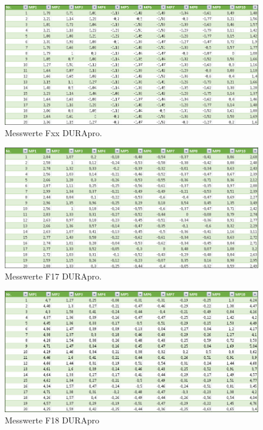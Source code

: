 \begin{figure}[H]
\centering
\includegraphics[width=.8\textwidth]{Fxxdurapro}
\caption{Messwerte Fxx DURApro.}
\label{Fxxdurapro}
\end{figure}
\begin{figure}[H]
\centering
\includegraphics[width=.8\textwidth]{F17durapro}
\caption{Messwerte F17 DURApro.}
\label{F17durapro}
\end{figure}
\begin{figure}[H]
\centering
\includegraphics[width=.8\textwidth]{F18durapro}
\caption{Messwerte F18 DURApro}
\label{F18durapro}
\end{figure}



















